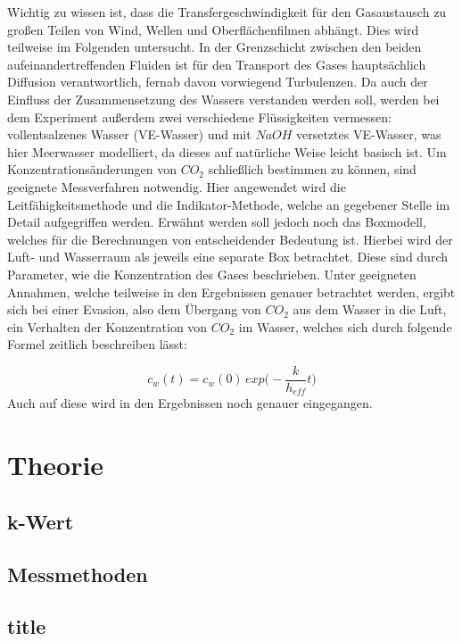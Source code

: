 \documentclass[12pt]{article}
\begin{document}
Wichtig zu wissen ist, dass die Transfergeschwindigkeit für den Gasaustausch zu großen Teilen von Wind, Wellen und Oberflächenfilmen abhängt. Dies wird teilweise im Folgenden untersucht. In der Grenzschicht zwischen den beiden aufeinandertreffenden Fluiden ist für den Transport des Gases hauptsächlich Diffusion verantwortlich, fernab davon vorwiegend Turbulenzen. 
Da auch der Einfluss der Zusammensetzung des Wassers verstanden werden soll, werden bei dem Experiment außerdem zwei verschiedene Flüssigkeiten vermessen: vollentsalzenes Wasser (VE-Wasser) und mit $NaOH$ versetztes VE-Wasser, was hier Meerwasser modelliert, da dieses auf natürliche Weise leicht basisch ist. Um Konzentrationsänderungen von $CO_2$ schließlich bestimmen zu können, sind geeignete Messverfahren notwendig. Hier angewendet wird die Leitfähigkeitsmethode und die Indikator-Methode, welche an gegebener Stelle im Detail aufgegriffen werden. Erwähnt werden soll jedoch noch das Boxmodell, welches für die Berechnungen von entscheidender Bedeutung ist. Hierbei wird der Luft- und Wasserraum als jeweils eine separate Box betrachtet. Diese sind durch Parameter, wie die Konzentration des Gases beschrieben. Unter geeigneten Annahmen, welche teilweise in den Ergebnissen genauer betrachtet werden, ergibt sich bei einer Evasion, also dem Übergang von $CO_2$ aus dem Wasser in die Luft, ein Verhalten der Konzentration von $CO_2$ im Wasser, welches sich durch folgende Formel zeitlich beschreiben lässt: 

\begin{equation}
c_w(t) = c_w(0) \, exp\Big(- \frac{k}{h_{eff}}t\Big)
\end{equation}
Auch auf diese wird in den Ergebnissen noch genauer eingegangen.




\section{Theorie}
\subsection*{k-Wert}
\subsection{Messmethoden}
\subsection{title}
\end{document}
